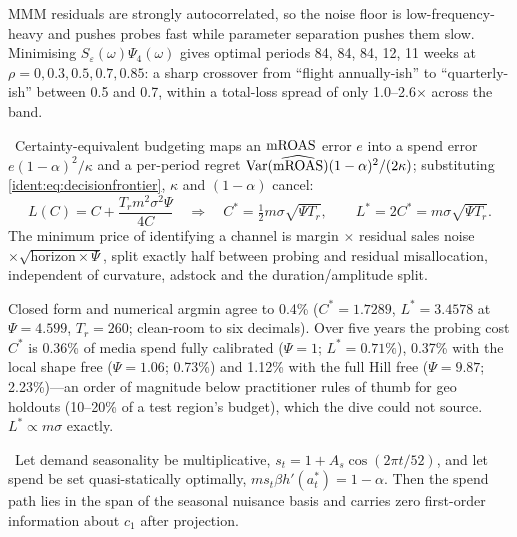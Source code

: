 MMM residuals are strongly autocorrelated, so the noise floor is low-frequency-heavy and pushes probes fast while parameter separation pushes them slow. Minimising $S_\varepsilon(\omega)\Psi_4(\omega)$ gives optimal periods 84, 84, 84, 12, 11 weeks at $\rho = 0, 0.3, 0.5, 0.7, 0.85$: a sharp crossover from ``flight annually-ish'' to ``quarterly-ish'' between 0.5 and 0.7, within a total-loss spread of only 1.0--2.6$\times$ across the band.

\begin{theorem}
\label{ident:thm:price}
\tagEstablished\ Certainty-equivalent budgeting maps an $\mathrm{mROAS}$ error $e$ into a spend error $e(1-\alpha)^2/\kappa$ and a per-period regret $\operatorname{Var}(\widehat{\mathrm{mROAS}})(1-\alpha)^2/(2\kappa)$; substituting \cref{ident:eq:decisionfrontier}, $\kappa$ and $(1-\alpha)$ cancel:
\begin{equation}
L(C) = C + \frac{T_r m^2\sigma^2\Psi}{4C} \quad\Longrightarrow\quad C^* = \tfrac12 m\sigma\sqrt{\Psi T_r}, \qquad L^* = 2C^* = m\sigma\sqrt{\Psi T_r}.
\label{ident:eq:price}
\end{equation}
The minimum price of identifying a channel is margin $\times$ residual sales noise $\times\sqrt{\text{horizon}\times\Psi}$, split exactly half between probing and residual misallocation, independent of curvature, adstock and the duration/amplitude split.
\end{theorem}

Closed form and numerical argmin agree to 0.4\% ($C^* = 1.7289$, $L^* = 3.4578$ at $\Psi = 4.599$, $T_r = 260$; clean-room to six decimals). Over five years the probing cost $C^*$ is 0.36\% of media spend fully calibrated ($\Psi = 1$; $L^* = 0.71\%$), 0.37\% with the local shape free ($\Psi = 1.06$; 0.73\%) and 1.12\% with the full Hill free ($\Psi = 9.87$; 2.23\%)---an order of magnitude below practitioner rules of thumb for geo holdouts (10--20\% of a test region's budget), which the dive could not source. $L^* \propto m\sigma$ exactly.

\begin{theorem}
\label{ident:thm:nonident}
\tagEstablished\ Let demand seasonality be multiplicative, $s_t = 1 + A_s\cos(2\pi t/52)$, and let spend be set quasi-statically optimally, $ms_t\beta h'(a_t^*) = 1-\alpha$. Then the spend path lies in the span of the seasonal nuisance basis and carries zero first-order information about $c_1$ after projection.
\end{theorem}

